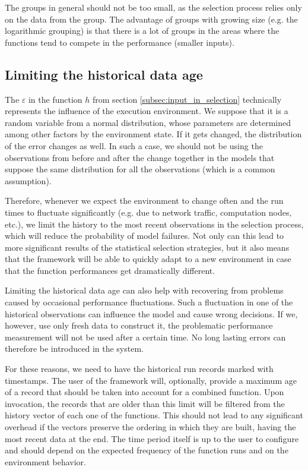 The groups in general should not be too small, as the selection process relies only on the data from the group. The advantage of groups with growing size (e.g. the logarithmic grouping) is that there is a lot of groups in the areas where the functions tend to compete in the performance (smaller inputs).

\subsection{Limiting the historical data age}
\label{subsec:limiting_record_age}

The $\varepsilon$ in the function $h$ from section \ref{subsec:input_in_selection} technically represents the influence of the execution environment. We suppose that it is a random variable from a normal distribution, whose parameters are determined among other factors by the environment state. If it gets changed, the distribution of the error changes as well. In such a case, we should not be using the observations from before and after the change together in the models that suppose the same distribution for all the observations (which is a common assumption).

Therefore, whenever we expect the environment to change often and the run times to fluctuate significantly (e.g. due to network traffic, computation nodes, etc.), we limit the history to the most recent observations in the selection process, which will reduce the probability of model failures. Not only can this lead to more significant results of the statistical selection strategies, but it also means that the framework will be able to quickly adapt to a new environment in case that the function performances get dramatically different.

Limiting the historical data age can also help with recovering from problems caused by occasional performance fluctuations. Such a fluctuation in one of the historical observations can influence the model and cause wrong decisions. If we, however, use only fresh data to construct it, the problematic performance measurement will not be used after a certain time. No long lasting errors can therefore be introduced in the system.

For these reasons, we need to have the historical run records marked with timestamps. The user of the framework will, optionally, provide a maximum age of a record that should be taken into account for a combined function. Upon invocation, the records that are older than this limit will be filtered from the history vector of each one of the functions. This should not lead to any significant overhead if the vectors preserve the ordering in which they are built, having the most recent data at the end. The time period itself is up to the user to configure and should depend on the expected frequency of the function runs and on the environment behavior.

